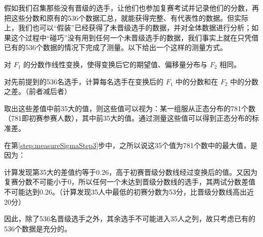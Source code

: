             \vspace{1.5ex}

            假如我们召集那些没有晋级的选手，让他们也参加复赛考试并记录他们的分数，再把这些分数和原有的536个数据汇总，就能获得完整、有代表性的数据。但实际上，我们也可以“假装”已经获得了未晋级选手的数据，并对全体数据进行分析；如果这个过程中“碰巧”没有用到任何一个未晋级选手的数据，我们事实上就在只凭借已有的536个数据的情况下完成了测量。以下给出一个这样的测量方式。

            \begin{asparaenum}[\bfseries{步骤} 1.]
                \item \label{step:measureSigmaStep1} 对 $F_1$ 的分数作线性变换，使得变换后它的期望值、偏移量分布与 $F_2$ 相同。
                \item 对先前提到的536名选手，计算每名选手在变换后的 $F_1$ 中的分数和在 $F_2$ 中的分数之差。（前者减后者）
                \item \label{step:measureSigmaStep3} 取出这些差值中前35大的值，则这些值可以视为：某一组服从正态分布的781个数（781即初赛参赛人数），其中前35大的值。通过测量这些值可以得到正态分布的标准差。
            \end{asparaenum}

            \vspace{1.5ex}

            在第\ref{step:measureSigmaStep3}步中，之所以说这35个值为781个数中的最大值，是因为：
            \begin{asparaitem}
                \item 计算发现第35大的差值约等于$0.26$，高于初赛晋级分数线经过变换后的值。又因为复赛分数不可能小于$0$，所以任何一个未达到晋级分数线的选手，其两试分数差值不可能达到$0.26$。（计算发现35人中最低的初赛分数为53分，比晋级分数线高出近20分）
                \item 因此，除了536名晋级选手之外，其余选手不可能进入35人之列，故只考虑已有的536个数据是充分的。
            \end{asparaitem}

            \vspace{1.5ex}

